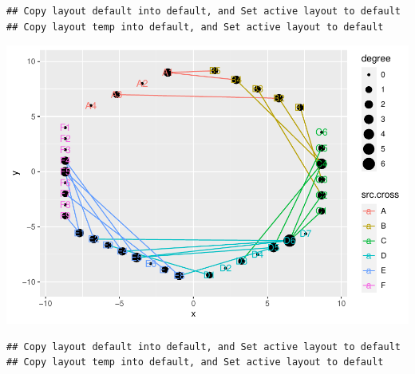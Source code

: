\documentclass[
]{article}
\newenvironment{Shaded}{\begin{snugshade}}{\end{snugshade}}
\newcommand{\CommentTok}[1]{\textcolor[rgb]{0.56,0.35,0.01}{\textit{#1}}}
\newcommand{\KeywordTok}[1]{\textcolor[rgb]{0.13,0.29,0.53}{\textbf{#1}}}
\newcommand{\NormalTok}[1]{#1}
\newcommand{\OperatorTok}[1]{\textcolor[rgb]{0.81,0.36,0.00}{\textbf{#1}}}
\newcommand{\StringTok}[1]{\textcolor[rgb]{0.31,0.60,0.02}{#1}}
\begin{document}
\begin{Shaded}
\end{Shaded}

\begin{verbatim}
## Copy layout default into default, and Set active layout to default
## Copy layout temp into default, and Set active layout to default
\end{verbatim}

\includegraphics{ReadMe1_files/figure-latex/unnamed-chunk-7-5.pdf}

\begin{Shaded}
\end{Shaded}

\begin{verbatim}
## Copy layout default into default, and Set active layout to default
## Copy layout temp into default, and Set active layout to default
\end{verbatim}
\end{document}
